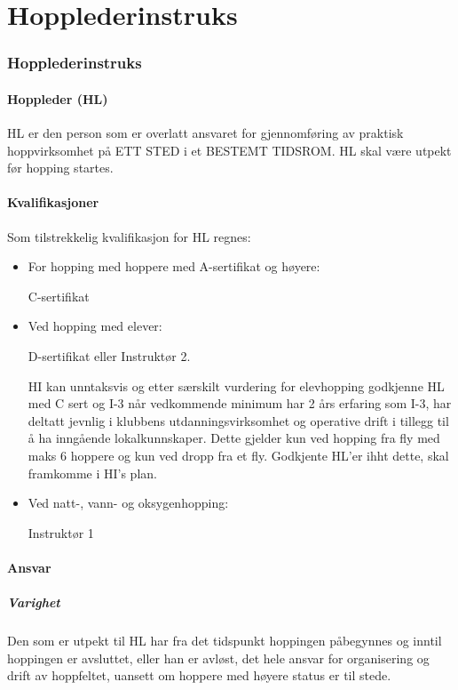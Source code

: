 \part{Hopplederinstruks}
\setcounter{section}{505}

\section{Hopplederinstruks}

\subsection{Hoppleder (HL)}
HL er den person som er overlatt ansvaret for gjennomføring av praktisk hoppvirksomhet på ETT STED i et BESTEMT TIDSROM. HL skal være utpekt før hopping startes.

\subsection{Kvalifikasjoner}
Som tilstrekkelig kvalifikasjon for HL regnes:
\begin{itemize}
	\item For hopping med hoppere med A-sertifikat og høyere:

	C-sertifikat
	\item Ved hopping med elever:

	D-sertifikat eller Instruktør 2.

	HI kan unntaksvis og etter særskilt vurdering for elevhopping godkjenne HL med C sert og I-3 når vedkommende minimum har 2 års erfaring som I-3, har deltatt jevnlig i klubbens utdanningsvirksomhet og operative drift i tillegg til å ha inngående lokalkunnskaper. Dette gjelder kun ved hopping fra fly med maks 6 hoppere og kun ved dropp fra et fly. Godkjente HL’er ihht dette, skal framkomme i HI’s plan.

	\item Ved natt-, vann- og oksygenhopping:

	Instruktør 1
\end{itemize}

\subsection{Ansvar}
\subsubsection{Varighet}
Den som er utpekt til HL har fra det tidspunkt hoppingen påbegynnes og inntil hoppingen er avsluttet, eller han er avløst, det hele ansvar for organisering og drift av hoppfeltet, uansett om hoppere med høyere status er til stede.

